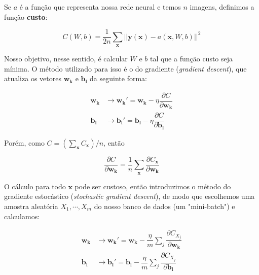 \documentclass{article}
\begin{document}
            Se $a$ é a função que representa nossa rede neural e temos $n$ imagens, definimos a função \textbf{custo}:
            
            \begin{equation}
                C(W, b) = \dfrac{1}{2n} \sum_{\mathbf{x}} ||\mathbf{y}(\mathbf{x}) - a(\mathbf{x}, W, b)||^2
            \end{equation}

            Nosso objetivo, nesse sentido, é calcular $W$ e $b$ tal que a função custo seja mínima.
            O método utilizado para isso é o do gradiente (\textit{gradient descent}), que atualiza os vetores $\mathbf{w_k}$ e $\mathbf{b_l}$ da seguinte forma:

            \begin{equation}
                \begin{split}
                    \mathbf{w_k} &\rightarrow \mathbf{w_k'} = \mathbf{w_k} - \eta \dfrac{\partial C}{\partial \mathbf{w_k}} \\
                    \mathbf{b_l} &\rightarrow \mathbf{b_l'} = \mathbf{b_l} - \eta \dfrac{\partial C}{\partial \mathbf{b_l}}
                \end{split}
            \end{equation}

            Porém, como $C = (\sum_{\mathbf{x}} C_{\mathbf{x}}) / n$, então
            
            \begin{equation}
                \dfrac{\partial C}{\partial \mathbf{w_k}} = \dfrac{1}{n} \sum_{\mathbf{x}} \dfrac{\partial C_{\mathbf{x}}}{\partial \mathbf{w_k}}
            \end{equation}
            
            O cálculo para todo $\mathbf{x}$ pode ser custoso, então introduzimos o método do gradiente estocástico (\textit{stochastic gradient descent}), de modo que escolhemos uma amostra aleatória $X_1, \cdots, X_m$ do nosso banco de dados (um "mini-batch") e calculamos:

            \begin{equation}
                \begin{split}
                    \mathbf{w_k} &\rightarrow \mathbf{w_k'} = \mathbf{w_k} - \dfrac{\eta}{m} \sum_j \dfrac{\partial C_{X_j}}{\partial \mathbf{w_k}} \\
                    \mathbf{b_l} &\rightarrow \mathbf{b_l'} = \mathbf{b_l} - \dfrac{\eta}{m} \sum_j \dfrac{\partial C_{X_j}}{\partial \mathbf{b_l}}
                \end{split}
            \end{equation}
\end{document}

